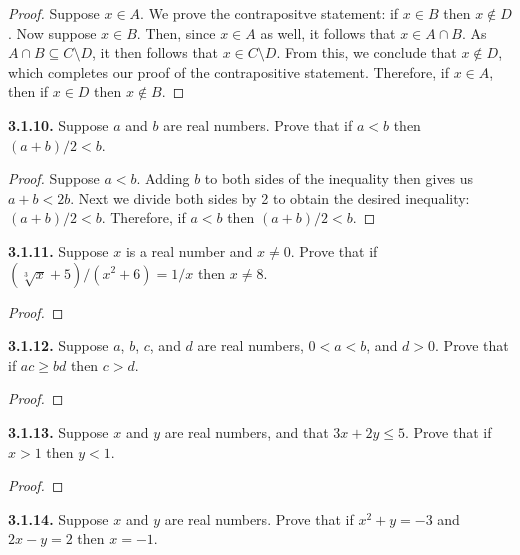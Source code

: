\documentclass[12pt]{amsart}
\newenvironment{statement}[1]{\smallskip\noindent\color[rgb]{.6627, .3529, .6314} {\bf #1.}}{}
\theoremstyle{definition}
\theoremstyle{remark}
\begin{document}
\begin{proof}
Suppose $x \in A$.
We prove the contrapositve statement: if $x \in B$ then $x \notin D$.
Now suppose $x \in B$.
Then, since $x \in A$ as well, it follows that $x \in A \cap B$.
As $A \cap B \subseteq C \setminus D$, it then follows that $x \in C \setminus D$.
From this, we conclude that $x \notin D$, which completes our proof of the contrapositive statement.
Therefore, if $x \in A$, then if $x \in D$ then $x \notin B$.
\end{proof}


\begin{statement}{3.1.10}
Suppose $a$ and $b$ are real numbers.
Prove that if $a < b$ then $(a + b) / 2 < b$.
\end{statement}

\begin{proof}
Suppose $a < b$.
Adding $b$ to both sides of the inequality then gives us $a + b < 2b$.
Next we divide both sides by 2 to obtain the desired inequality: $(a + b)/2 < b$.
Therefore, if $a < b$ then $(a + b)/2 < b$.
\end{proof}


\begin{statement}{3.1.11}
Suppose $x$ is a real number and $x \neq 0$.
Prove that if $(\sqrt[3]{x} + 5) / (x^2 + 6) = 1/x$ then $x \neq 8$.
\end{statement}

\begin{proof}
\end{proof}


\begin{statement}{3.1.12}
Suppose $a$, $b$, $c$, and $d$ are real numbers, $0 < a < b$, and $d > 0$.
Prove that if $ac \geq bd$ then $c > d$.
\end{statement}

\begin{proof}
\end{proof}


\begin{statement}{3.1.13}
Suppose $x$ and $y$ are real numbers, and that $3x + 2y \leq 5$.
Prove that if $x > 1$ then $y < 1$.
\end{statement}

\begin{proof}
\end{proof}


\begin{statement}{3.1.14}
Suppose $x$ and $y$ are real numbers.
Prove that if $x^2 + y = -3$ and $2x - y = 2$ then $x = -1$.
\end{statement}
\end{document}
